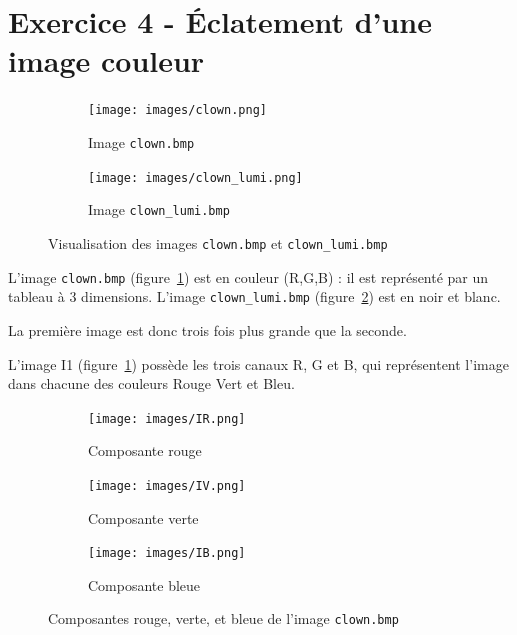 \documentclass[a4paper]{article}
\newcommand{\figref}[1]{figure~\ref{#1}}
\begin{document}
\section*{Exercice 4 - Éclatement d'une image couleur}

\begin{figure}[H]
    \centering
    \begin{subfigure}[c]{0.46\textwidth}
        \centering
        \texttt{[image: images/clown.png]}
        \caption{Image \texttt{clown.bmp}} 
        \label{subfig:clown}
    \end{subfigure}
    \begin{subfigure}[c]{0.46\textwidth}
        \centering
        \texttt{[image: images/clown\_lumi.png]}
        \caption{Image \texttt{clown\_lumi.bmp}} 
        \label{subfig:clown_lumi}
    \end{subfigure}
    \caption{Visualisation des images \texttt{clown.bmp} et
    \texttt{clown\_lumi.bmp}}
    \label{fig:clowns}
\end{figure}

L'image \texttt{clown.bmp} (\figref{subfig:clown}) est en couleur (R,G,B) : il
est représenté par un tableau à 3 dimensions. L'image \texttt{clown\_lumi.bmp}
(\figref{subfig:clown_lumi}) est en noir et blanc.

La première image est donc trois fois plus grande que la seconde.

L’image I1 (\figref{subfig:clown}) possède les trois canaux R, G et B, qui
représentent l’image dans chacune des couleurs Rouge Vert et Bleu.

\begin{figure}[H]
    \centering
    \begin{subfigure}[c]{0.3\textwidth}
        \centering
        \texttt{[image: images/IR.png]}
        \caption{Composante rouge} 
        \label{subfig:IR}
    \end{subfigure}
    \begin{subfigure}[c]{0.3\textwidth}
        \centering
        \texttt{[image: images/IV.png]}
        \caption{Composante verte} 
        \label{subfig:IV}
    \end{subfigure}
    \begin{subfigure}[c]{0.3\textwidth}
        \centering
        \texttt{[image: images/IB.png]}
        \caption{Composante bleue} 
        \label{subfig:IB}
    \end{subfigure}
    \caption{Composantes rouge, verte, et bleue de l'image \texttt{clown.bmp}}
    \label{fig:composantes}
\end{figure}
\end{document}
